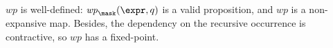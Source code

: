 

\begin{lem}
	$\mathit{wp}$ is well-defined: $\mathit{wp}_{\mask}(\expr, q)$ is a valid proposition, and $\mathit{wp}$ is a non-expansive map. Besides, the dependency on the recursive occurrence is contractive, so $\mathit{wp}$ has a fixed-point.
\end{lem}

